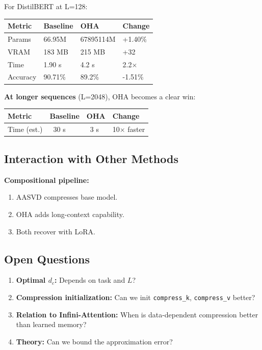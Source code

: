 For DistilBERT at L=128:

\begin{table}[H]
\centering
\small
\begin{tabular}{llll}
\toprule
\textbf{Metric} & \textbf{Baseline} & \textbf{OHA} & \textbf{Change} \\
\midrule
Params & 66.95M & 67895114M & +1.40\% \\
VRAM & 183 MB & 215 MB & +32 \\
Time & 1.90 s & 4.2 s & 2.2$\times$ \\
Accuracy & 90.71\% & 89.2\% & -1.51\% \\
\bottomrule
\end{tabular}
\end{table}

\textbf{At longer sequences} (L=2048), OHA becomes a clear win:

\begin{table}[H]
\centering
\small
\begin{tabular}{llll}
\toprule
\textbf{Metric} & \textbf{Baseline} & \textbf{OHA} & \textbf{Change} \\
\midrule
Time (est.) & ~30 s & ~3 s & 10$\times$ faster \\
\bottomrule
\end{tabular}
\end{table}

\subsection{Interaction with Other Methods}

\textbf{Compositional pipeline:}

\begin{enumerate}
\item AASVD compresses base model.
\item OHA adds long-context capability.
\item Both recover with LoRA.

\end{enumerate}
\subsection{Open Questions}

\begin{enumerate}
\item \textbf{Optimal $d_c$:} Depends on task and $L$?
\item \textbf{Compression initialization:} Can we init \texttt{compress\_k}, \texttt{compress\_v}
  better?
\item \textbf{Relation to Infini-Attention:} When is data-dependent compression
  better than learned memory?
\item \textbf{Theory:} Can we bound the approximation error?

\end{enumerate}

